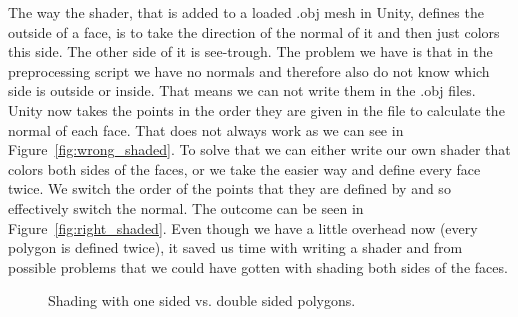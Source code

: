 \begin{description}[align=left]
	\item [Shading]
	The way the shader, that is added to a loaded .obj mesh in Unity, defines the outside of a face, is to take the direction of the normal of it and then just colors this side. The other side of it is see-trough. The problem we have is that in the preprocessing script we have no normals and therefore also do not know which side is outside or inside. That means we can not write them in the .obj files. \newline 
	Unity now takes the points in the order they are given in the file to calculate the normal of each face. That does not always work as we can see in Figure~\ref{fig:wrong_shaded}. To solve that we can either write our own shader that colors both sides of the faces, or we take the easier way and define every face twice. We switch the order of the points that they are defined by and so effectively switch the normal. The outcome can be seen in Figure~\ref{fig:right_shaded}. Even though we have a little overhead now (every polygon is defined twice), it saved us time with writing a shader and from possible problems that we could have gotten with shading both sides of the faces.
	
	\begin{figure}[!ht]
		\captionsetup{justification=centering}
		\centering
		\hfill
		\hfill
		\caption{Shading with one sided vs. double sided polygons.}
		\label{fig:shading.}
	\end{figure}


\end{description}

